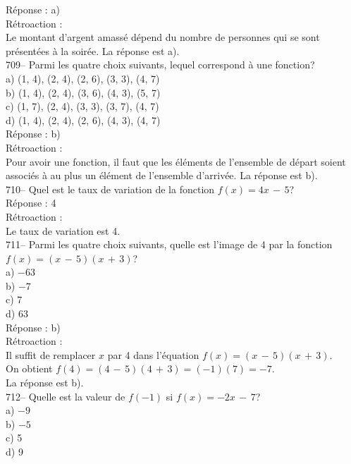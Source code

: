 ﻿\documentclass[letterpaper, 12pt]{article}
\begin{document}
R\'eponse :  a)\\

R\'etroaction :  \\
Le montant d'argent amass\'e d\'epend du nombre de personnes qui se sont
pr\'esent\'ees \`a la soir\'ee.  La r\'eponse est a).\\

709-- Parmi les quatre choix suivants, lequel correspond \`a une fonction?\\
a) {(1, 4), (2, 4), (2, 6), (3, 3), (4, 7)}\\
b) {(1, 4), (2, 4), (3, 6), (4, 3), (5, 7)}\\
c) {(1, 7), (2, 4), (3, 3), (3, 7), (4, 7)}\\
d) {(1, 4), (2, 4), (2, 6), (4, 3), (4, 7)}\\

R\'eponse :  b)\\

R\'etroaction :  \\
Pour avoir une fonction, il faut que  les \'el\'ements de l'ensemble de
d\'epart soient associ\'es \`a au plus un \'el\'ement de l'ensemble
d'arriv\'ee.  La r\'eponse est b).\\

710-- Quel est le taux de variation de la fonction $f(x)=4x\,-\,5$?\\

R\'eponse :  4\\

R\'etroaction :  \\
Le taux de variation est 4.\\

711-- Parmi les quatre choix suivants, quelle est l'image de 4 par la
fonction $f(x)=(x\,-\,5)(x\,+\,3)$?\\
a) $-63$\\
b) $-7$\\
c) 7\\
d) 63\\

R\'eponse : b)\\

R\'etroaction : \\
Il suffit de remplacer $x$ par 4 dans l'\'equation
$f(x)=(x\,-\,5)(x\,+\,3)$.\\
On obtient $f(4)=(4\,-\,5)(4\,+\,3)=(-1)(7)=-7$.\\
La r\'eponse est b).\\

712-- Quelle est la valeur de $f(-1)$ si $f(x)=-2x\,-\,7$?\\
a) $-9$\\
b) $-5$\\
c) 5\\
d) 9\\
\end{document}

